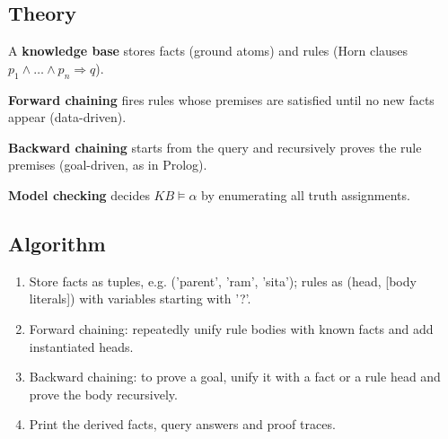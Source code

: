 \documentclass[11pt]{article}
\begin{document}
\subsection*{Theory}
A \textbf{knowledge base} stores facts (ground atoms) and rules (Horn clauses $p_1\wedge\dots\wedge p_n\Rightarrow q$).

\textbf{Forward chaining} fires rules whose premises are satisfied until no new facts appear (data-driven).

\textbf{Backward chaining} starts from the query and recursively proves the rule premises (goal-driven, as in Prolog).

\textbf{Model checking} decides $KB\models\alpha$ by enumerating all truth assignments.
\subsection*{Algorithm}
\begin{algo}[Procedure]\begin{enumerate}
\item Store facts as tuples, e.g. ('parent', 'ram', 'sita'); rules as (head, [body literals]) with variables starting with '?'.
\item Forward chaining: repeatedly unify rule bodies with known facts and add instantiated heads.
\item Backward chaining: to prove a goal, unify it with a fact or a rule head and prove the body recursively.
\item Print the derived facts, query answers and proof traces.
\end{enumerate}\end{algo}
\end{document}
